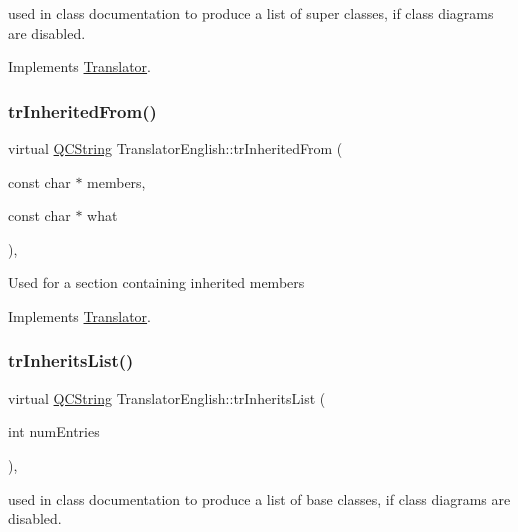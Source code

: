 used in class documentation to produce a list of super classes, if class diagrams are disabled. 

Implements \mbox{\hyperlink{class_translator}{Translator}}.

\mbox{\label{class_translator_english_a94b01e04f8622b755979a1a27f43cbe7}} 
\subsubsection{\texorpdfstring{trInheritedFrom()}{trInheritedFrom()}}
{\footnotesize\ttfamily virtual \mbox{\hyperlink{class_q_c_string}{Q\+C\+String}} Translator\+English\+::tr\+Inherited\+From (\begin{DoxyParamCaption}\item[{const char $\ast$}]{members,  }\item[{const char $\ast$}]{what }\end{DoxyParamCaption})\hspace{0.3cm}{\ttfamily [inline]}, {\ttfamily [virtual]}}

Used for a section containing inherited members 

Implements \mbox{\hyperlink{class_translator}{Translator}}.

\mbox{\label{class_translator_english_a2f78246cc4384db12d9179b505d12843}} 
\subsubsection{\texorpdfstring{trInheritsList()}{trInheritsList()}}
{\footnotesize\ttfamily virtual \mbox{\hyperlink{class_q_c_string}{Q\+C\+String}} Translator\+English\+::tr\+Inherits\+List (\begin{DoxyParamCaption}\item[{int}]{num\+Entries }\end{DoxyParamCaption})\hspace{0.3cm}{\ttfamily [inline]}, {\ttfamily [virtual]}}

used in class documentation to produce a list of base classes, if class diagrams are disabled. 

